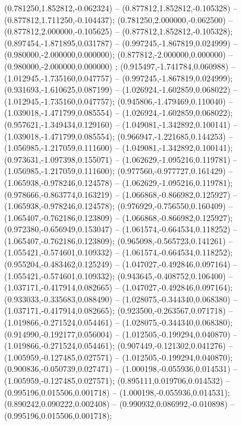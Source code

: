  (0.781250,1.852812,-0.062324) -- (0.877812,1.852812,-0.105328) -- (0.877812,1.711250,-0.104437);
 (0.781250,2.000000,-0.062500) -- (0.877812,2.000000,-0.105625) -- (0.877812,1.852812,-0.105328);
 (0.897454,-1.871895,0.031787) -- (0.997245,-1.867819,0.024999) -- (0.980000,-2.000000,0.000000);
 (0.877812,-2.000000,0.000000) -- (0.980000,-2.000000,0.000000) ;
 (0.915497,-1.741784,0.060988) -- (1.012945,-1.735160,0.047757) -- (0.997245,-1.867819,0.024999);
 (0.931693,-1.610625,0.087199) -- (1.026924,-1.602859,0.068022) -- (1.012945,-1.735160,0.047757);
 (0.945806,-1.479469,0.110040) -- (1.039018,-1.471799,0.085554) -- (1.026924,-1.602859,0.068022);
 (0.957621,-1.349434,0.129160) -- (1.049081,-1.342892,0.100141) -- (1.039018,-1.471799,0.085554);
 (0.966947,-1.221685,0.144253) -- (1.056985,-1.217059,0.111600) -- (1.049081,-1.342892,0.100141);
 (0.973631,-1.097398,0.155071) -- (1.062629,-1.095216,0.119781) -- (1.056985,-1.217059,0.111600);
 (0.977560,-0.977727,0.161429) -- (1.065938,-0.978246,0.124578) -- (1.062629,-1.095216,0.119781);
 (0.978666,-0.863774,0.163219) -- (1.066868,-0.866982,0.125927) -- (1.065938,-0.978246,0.124578);
 (0.976929,-0.756550,0.160409) -- (1.065407,-0.762186,0.123809) -- (1.066868,-0.866982,0.125927);
 (0.972380,-0.656949,0.153047) -- (1.061574,-0.664534,0.118252) -- (1.065407,-0.762186,0.123809);
 (0.965098,-0.565723,0.141261) -- (1.055421,-0.574601,0.109332) -- (1.061574,-0.664534,0.118252);
 (0.955204,-0.483462,0.125249) -- (1.047027,-0.492846,0.097164) -- (1.055421,-0.574601,0.109332);
 (0.943645,-0.408752,0.106400) -- (1.037171,-0.417914,0.082665) -- (1.047027,-0.492846,0.097164);
 (0.933033,-0.335683,0.088490) -- (1.028075,-0.344340,0.068380) -- (1.037171,-0.417914,0.082665);
 (0.923500,-0.263567,0.071718) -- (1.019866,-0.271524,0.054461) -- (1.028075,-0.344340,0.068380);
 (0.914990,-0.192177,0.056004) -- (1.012505,-0.199294,0.040870) -- (1.019866,-0.271524,0.054461);
 (0.907449,-0.121302,0.041276) -- (1.005959,-0.127485,0.027571) -- (1.012505,-0.199294,0.040870);
 (0.900836,-0.050739,0.027471) -- (1.000198,-0.055936,0.014531) -- (1.005959,-0.127485,0.027571);
 (0.895111,0.019706,0.014532) -- (0.995196,0.015506,0.001718) -- (1.000198,-0.055936,0.014531);
 (0.890242,0.090222,0.002408) -- (0.990932,0.086992,-0.010898) -- (0.995196,0.015506,0.001718);
